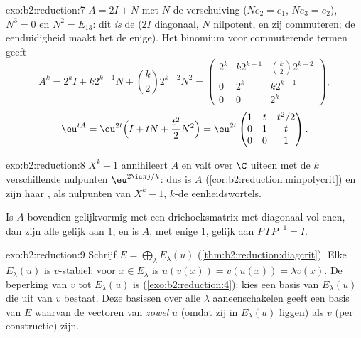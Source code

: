 \begin{solution}{exo:b2:reduction:7}
$A = 2I + N$ met $N$ de verschuiving ($N e_2 = e_1$, $Ne_3 = e_2$),
$N^3 = 0$ en $N^2 = E_{13}$: dit \emph{is} de 
($2I$ diagonaal, $N$ nilpotent, en zij commuteren; de eenduidigheid
maakt het de enige). Het binomium voor commuterende termen geeft
\[
A^k = 2^k I + k 2^{k-1} N + \binom k2 2^{k-2} N^2
= \begin{pmatrix}
2^k & k2^{k-1} & \binom k2 2^{k-2}\\
0 & 2^k & k2^{k-1}\\
0 & 0 & 2^k
\end{pmatrix},
\]
\[
\eu^{tA} = \eu^{2t}\Bigl(I + tN + \frac{t^2}{2}N^2\Bigr)
= \eu^{2t}\begin{pmatrix}
1 & t & t^2/2\\
0 & 1 & t\\
0 & 0 & 1
\end{pmatrix}.
\]
\end{solution}

\begin{solution}{exo:b2:reduction:8}
$X^k - 1$ annihileert $A$ en valt over $\C$ uiteen met de $k$
verschillende nulpunten $\eu^{2\iu\pi j/k}$: dus is $A$
 (\cref{cor:b2:reduction:minpolycrit}) en zijn
haar , als nulpunten van $X^k - 1$, $k$-de
eenheidswortels.

Is $A$ bovendien gelijkvormig met een driehoeksmatrix met diagonaal
vol enen, dan zijn alle  gelijk aan $1$, en is $A$,
 met enige  $1$, gelijk aan $P\,I\,P^{-1}
= I$.
\end{solution}

\begin{solution}{exo:b2:reduction:9}
Schrijf $E = \bigoplus_\lambda E_\lambda(u)$
(\cref{thm:b2:reduction:diagcrit}). Elke $E_\lambda(u)$ is
$v$-stabiel: voor $x \in E_\lambda$ is $u(v(x)) = v(u(x)) = \lambda
v(x)$. De beperking van $v$ tot $E_\lambda(u)$ is
 (\cref{exo:b2:reduction:4}): kies een basis van
$E_\lambda(u)$ die uit  van $v$ bestaat. Deze basissen
over alle $\lambda$ aaneenschakelen geeft een basis van $E$ waarvan
de vectoren  van \emph{zowel} $u$ (omdat zij in
$E_\lambda(u)$ liggen) als $v$ (per constructie) zijn.
\end{solution}

